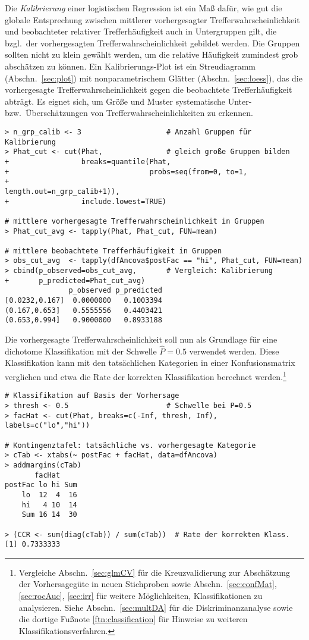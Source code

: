 Die \emph{Kalibrierung} einer logistischen Regression ist ein Maß dafür, wie gut die globale Entsprechung zwischen mittlerer vorhergesagter Trefferwahrscheinlichkeit und beobachteter relativer Trefferhäufigkeit auch in Untergruppen gilt, die bzgl.\ der vorhergesagten Trefferwahrscheinlichkeit gebildet werden. Die Gruppen sollten nicht zu klein gewählt werden, um die relative Häufigkeit zumindest grob abschätzen zu können. Ein Kalibrierungs-Plot ist ein Streudiagramm (Abschn.\ \ref{sec:plot}) mit nonparametrischem Glätter (Abschn.\ \ref{sec:loess}), das die vorhergesagte Trefferwahrscheinlichkeit gegen die beobachtete Trefferhäufigkeit abträgt. Es eignet sich, um Größe und Muster systematische Unter- bzw.\ Überschätzungen von Trefferwahrscheinlichkeiten zu erkennen.
\begin{lstlisting}
> n_grp_calib <- 3                    # Anzahl Gruppen für Kalibrierung
> Phat_cut <- cut(Phat,               # gleich große Gruppen bilden
+                 breaks=quantile(Phat,
+                                 probs=seq(from=0, to=1,
+                                           length.out=n_grp_calib+1)),
+                 include.lowest=TRUE)

# mittlere vorhergesagte Trefferwahrscheinlichkeit in Gruppen
> Phat_cut_avg <- tapply(Phat, Phat_cut, FUN=mean)

# mittlere beobachtete Trefferhäufigkeit in Gruppen
> obs_cut_avg  <- tapply(dfAncova$postFac == "hi", Phat_cut, FUN=mean)
> cbind(p_observed=obs_cut_avg,       # Vergleich: Kalibrierung
+       p_predicted=Phat_cut_avg)
               p_observed p_predicted
[0.0232,0.167]  0.0000000   0.1003394
(0.167,0.653]   0.5555556   0.4403421
(0.653,0.994]   0.9000000   0.8933188
\end{lstlisting}

Die vorhergesagte Trefferwahrscheinlichkeit soll nun als Grundlage für eine dichotome Klassifikation mit der Schwelle $\hat{P}=0.5$ verwendet werden. Diese Klassifikation kann mit den tatsächlichen Kategorien in einer Konfusionsmatrix verglichen und etwa die Rate der korrekten Klassifikation berechnet werden.\footnote{Vergleiche Abschn.\ \ref{sec:glmCV} für die Kreuzvalidierung zur Abschätzung der Vorhersagegüte in neuen Stichproben sowie Abschn.\ \ref{sec:confMat}, \ref{sec:rocAuc}, \ref{sec:irr} für weitere Möglichkeiten, Klassifikationen zu analysieren. Siehe Abschn.\ \ref{sec:multDA} für die Diskriminanzanalyse sowie die dortige Fußnote \ref{ftn:classification} für Hinweise zu weiteren Klassifikationsverfahren.}
\begin{lstlisting}
# Klassifikation auf Basis der Vorhersage
> thresh <- 0.5                       # Schwelle bei P=0.5
> facHat <- cut(Phat, breaks=c(-Inf, thresh, Inf), labels=c("lo","hi"))

# Kontingenztafel: tatsächliche vs. vorhergesagte Kategorie
> cTab <- xtabs(~ postFac + facHat, data=dfAncova)
> addmargins(cTab)
       facHat
postFac lo hi Sum
    lo  12  4  16
    hi   4 10  14
    Sum 16 14  30

> (CCR <- sum(diag(cTab)) / sum(cTab))  # Rate der korrekten Klass.
[1] 0.7333333
\end{lstlisting}

